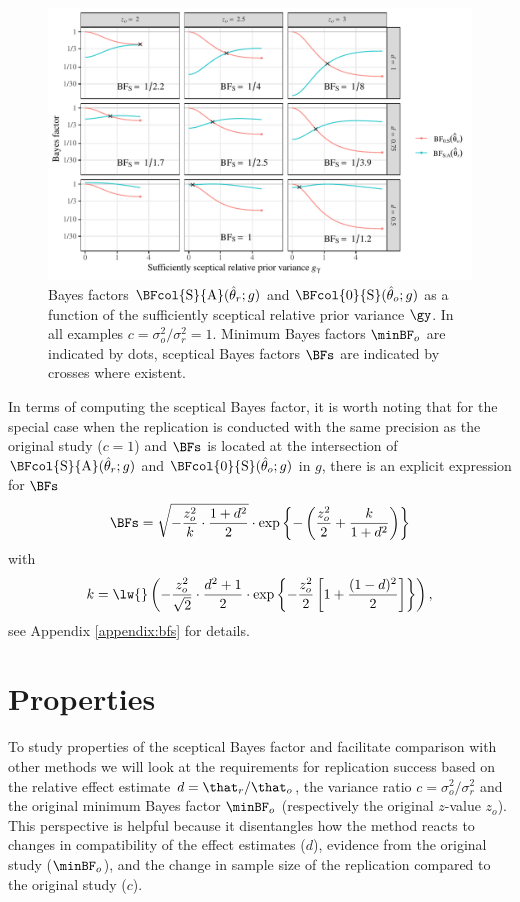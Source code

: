 \begin{figure}[!htb]
\begin{knitrout}
\color{fgcolor}
\includegraphics[width=\maxwidth]{images/paper2/plot-BFs-1}
\end{knitrout}
\caption{Bayes factors $\BFcol{\mathrm{S}}{\mathrm{A}}(\hat{\theta}_r; g)$ and
$\BFcol{0}{\mathrm{S}}(\hat{\theta}_o; g)$ as a function of the sufficiently
sceptical relative prior variance $\gy$. In all examples
$c = \sigma^2_o/\sigma^2_r = 1$. Minimum Bayes factors $\minBF_o$ are indicated
by dots, sceptical Bayes factors $\BFs$ are indicated by crosses where existent.}
\label{fig2:bfs}
\end{figure}


In terms of computing the sceptical Bayes factor, it is worth noting that for
the special case when the replication is conducted with the same precision as
the original study ($c = 1$) and $\BFs$ is located at the intersection of
$\BFcol{\mathrm{S}}{\mathrm{A}}(\hat{\theta}_r; g)$ and
$\BFcol{0}{\mathrm{S}}(\hat{\theta}_o; g)$ in $g$, there is an explicit expression
for $\BFs$
\begin{align}
  \label{eq2:BFsc1}
  \BFs =
  \sqrt{-\frac{z^2_{o}}{k} \cdot \frac{1 + d^{2}}{2}} \cdot
  \exp\left\{-\left(\frac{z_o^2}{2} + \frac{k}{1 + d^2}\right)\right\}
\end{align}
with
$$k = \lw{}\left(-\frac{z_{o}^{2}}{\sqrt{2}} \cdot \frac{d^{2} + 1}{2} \cdot \exp\left\{-\frac{z_o^2}{2}
  \left[1 + \frac{(1 -
d)^2}{2}\right]\right\}\right),$$ see Appendix \ref{appendix:bfs} for details.


\section{Properties}
\label{sec2:comparison}
To study properties of the sceptical Bayes factor and facilitate comparison with
other methods we will look at the requirements for replication success based on
the relative effect estimate $d = \that_{r}/\that_{o}$, the variance ratio
$c = \sigma^{2}_{o}/\sigma^{2}_{r}$ and the original minimum Bayes factor
$\minBF_{o}$ (respectively the original $z$-value $z_{o}$). This perspective is
helpful because it disentangles how the method reacts to changes in
compatibility of the effect estimates ($d$), evidence from the original study
($\minBF_{o}$), and the change in sample size of the replication compared to the
original study ($c$).

